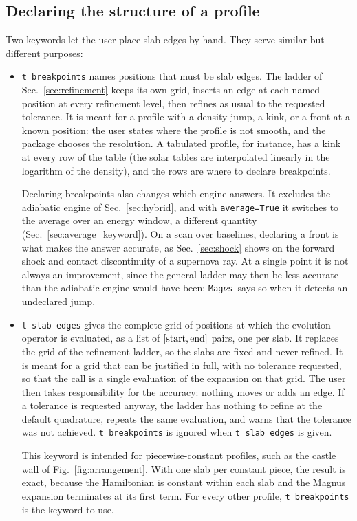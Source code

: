 \documentclass[final,5p,times,twocolumn,sort,compress]{elsarticle}
\makeatletter
\newcommand{\fig}{Fig.}
\DeclareRobustCommand{\_}{%
  \ifmmode\nfss@text{\textunderscore}\else\textunderscore\allowbreak\fi}
\newcommand{\figu}[1]{\fig~\ref{fig:#1}}
\newcommand{\magnus}{{\tt Mag}\ensuremath{\nu}{\tt s}}
\makeatother
\begin{document}

\subsection{Declaring the structure of a profile}
\label{sec:declaring_edges}

Two keywords let the user place slab edges by hand. They serve similar but different purposes:
\begin{itemize}
\item {\tt t\_breakpoints} names positions that must be slab edges. The ladder of Sec.~\ref{sec:refinement} keeps its own grid, inserts an edge at each named position at every refinement level, then refines as usual to the requested tolerance. It is meant for a profile with a density jump, a kink, or a front at a known position: the user states where the profile is not smooth, and the package chooses the resolution. A tabulated profile, for instance, has a kink at every row of the table (the solar tables are interpolated linearly in the logarithm of the density), and the rows are where to declare breakpoints.

Declaring breakpoints also changes which engine answers. It excludes the adiabatic engine of Sec.~\ref{sec:hybrid}, and with {\tt average=True} it switches to the average over an energy window, a different quantity (Sec.~\ref{sec:average_keyword}). On a scan over baselines, declaring a front is what makes the answer accurate, as Sec.~\ref{sec:shock} shows on the forward shock and contact discontinuity of a supernova ray. At a single point it is not always an improvement, since the general ladder may then be less accurate than the adiabatic engine would have been; \magnus\ says so when it detects an undeclared jump.
\item {\tt t\_slab\_edges} gives the complete grid of positions at which the evolution operator is evaluated, as a list of $[{\rm start}, {\rm end}]$ pairs, one per slab. It replaces the grid of the refinement ladder, so the slabs are fixed and never refined. It is meant for a grid that can be justified in full, with no tolerance requested, so that the call is a single evaluation of the expansion on that grid. The user then takes responsibility for the accuracy: nothing moves or adds an edge. If a tolerance is requested anyway, the ladder has nothing to refine at the default quadrature, repeats the same evaluation, and warns that the tolerance was not achieved. {\tt t\_breakpoints} is ignored when {\tt t\_slab\_edges} is given.

This keyword is intended for piecewise-constant profiles, such as the castle wall of \figu{arrangement}. With one slab per constant piece, the result is exact, because the Hamiltonian is constant within each slab and the Magnus expansion terminates at its first term. For every other profile, {\tt t\_breakpoints} is the keyword to use.
\end{itemize}
\end{document}

